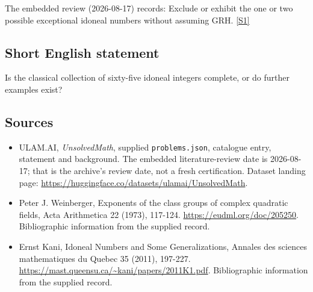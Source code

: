 \documentclass[11pt,a4paper]{article}
\newcommand{\sref}[2]{\hyperlink{source:#1:#2}{[S#2]}}
\begin{document}
The embedded review (2026-08-17) records: Exclude or exhibit the one or two possible exceptional idoneal numbers without assuming GRH. \sref{statement}{1}

\subsection{Short English statement}

Is the classical collection of sixty-five idoneal integers complete, or do further examples exist?

\subsection{Sources}

{\small

\begin{itemize}

\item[\hypertarget{source:statement:1}{S1}] ULAM.AI, \emph{UnsolvedMath}, supplied \texttt{problems.json}, catalogue entry, statement and background. The embedded literature-review date is 2026-08-17; that is the archive’s review date, not a fresh certification. Dataset landing page: \url{https://huggingface.co/datasets/ulamai/UnsolvedMath}.

\item[\hypertarget{source:statement:2}{S2}] Peter J. Weinberger, Exponents of the class groups of complex quadratic fields, Acta Arithmetica 22 (1973), 117-124. \url{https://eudml.org/doc/205250}. Bibliographic information from the supplied record.

\item[\hypertarget{source:statement:3}{S3}] Ernst Kani, Idoneal Numbers and Some Generalizations, Annales des sciences mathematiques du Quebec 35 (2011), 197-227. \url{https://mast.queensu.ca/~kani/papers/2011K1.pdf}. Bibliographic information from the supplied record.

\end{itemize}

}

\label{end:statement}
\end{document}
